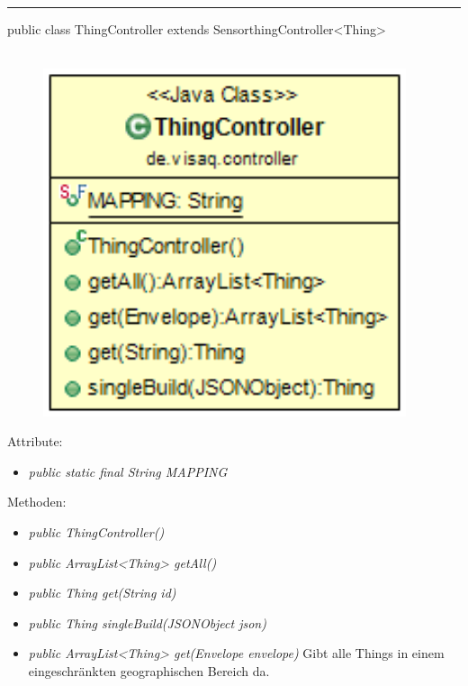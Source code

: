 \rule{\textwidth}{0.4pt}
public class ThingController extends SensorthingController<Thing>
\\\\
\begin{minipage}{0.4\textwidth}
    \begin{figure}[H]
        {\centering\includegraphics[width=0.95\textwidth]{media/backend/controller/classes/ThingController.png}}
    \end{figure}
    \end{minipage} \hfill
\begin{minipage}{0.6\textwidth}
\end{minipage}

Attribute:
\begin{itemize}
    \item \emph{public static final String MAPPING} \mappingDescription
\end{itemize}
Methoden:
\begin{itemize}
    \item \emph{public ThingController()}
    \item \emph{public ArrayList<Thing> getAll()}
    \extendsSensorthingController
    \item \emph{public Thing get(String id)}
    \extendsSensorthingController
    \item \emph{public Thing singleBuild(JSONObject json)}
    \extendsSensorthingController
    \item \emph{public ArrayList<Thing> get(Envelope envelope)}
    Gibt alle Things in einem eingeschränkten geographischen Bereich da.
\end{itemize}

